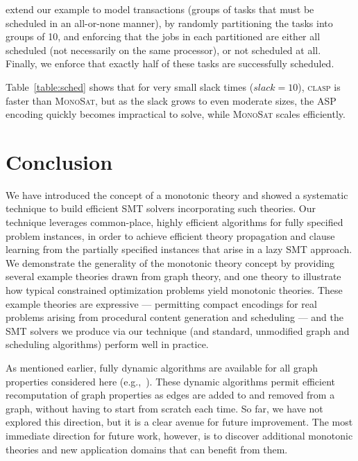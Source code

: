\documentclass[runningheads]{llncs}
\newcommand{\comments}[1]{}
\newcommand{\algformat}[1]{\textsc{#1}\xspace}
\newcommand{\monosat}{\algformat{MonoSat}}
\newcommand{\clasp}{\algformat{clasp}}
\begin{document}
extend our example to model transactions (groups
of tasks that must be scheduled in an all-or-none manner), by randomly
partitioning the tasks into groups of 10, and enforcing that the jobs in
each partitioned are either all scheduled (not necessarily on the same
processor), or not scheduled at all.  Finally, we enforce that exactly
half of these tasks are successfully scheduled.

Table~\ref{table:sched} shows that for very small slack times ($slack=10$),
\clasp is faster than \monosat, but as the slack grows to even moderate sizes,
the ASP encoding quickly becomes impractical to solve, while \monosat scales efficiently. 

 

\comments{
, of
which the SAT solver must choose half to be scheduled within 50, 100,
or 1000 time slots, respectively. 
As can be seen in
Table \ref{table:sched}, our theory solver scales well as the problem
size increases.
}




\vspace*{-1ex}
\section{Conclusion}

We have introduced the concept of a monotonic theory
and showed a systematic technique to build efficient SMT solvers incorporating
such theories.  Our technique leverages common-place, highly efficient
algorithms for fully specified problem instances, in order to achieve
efficient theory propagation and clause learning from the partially specified
instances that arise in a lazy SMT approach.
We demonstrate the generality of the monotonic theory concept by providing
several example theories drawn from graph theory, and one theory to illustrate
how typical constrained optimization problems yield monotonic theories.
These example theories are expressive --- permitting compact encodings for
real problems arising from procedural content generation and scheduling ---
and the SMT solvers we produce via our technique (and standard,
unmodified graph and scheduling algorithms) perform well in practice.


As mentioned earlier, fully dynamic algorithms
are available for all graph properties considered here
(e.g.,~\cite{henzinger1995fully,thorup1999undirected,thorup2000near,holm2001poly,thorup2001fully}).
These dynamic algorithms permit efficient recomputation of graph
properties as edges are added to and removed from a graph, without
having to start from scratch each time. So far, we have not explored this
direction, but it is a clear avenue for future improvement.
The most immediate direction for future work, however, is
to discover additional
monotonic theories and new application domains that can benefit from them.





\newpage



\end{document}
